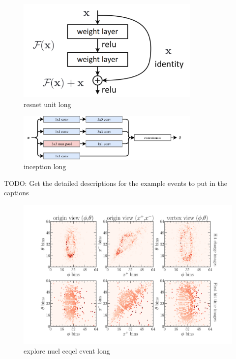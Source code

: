 \begin{figure}
    \includegraphics[width=0.8\textwidth]{diagrams/6-cvn/resnet_unit.png}
    \caption[resnet unit short]
    {resnet unit long}
    \label{fig:resnet_unit}
\end{figure}

\begin{figure}
    \includegraphics[width=0.8\textwidth]{diagrams/6-cvn/inception.pdf}
    \caption[inception short]
    {inception long}
    \label{fig:se}
\end{figure}

TODO: Get the detailed descriptions for the example events to put in the captions
\begin{figure}
    \includegraphics[width=\textwidth]{diagrams/6-cvn/chipsnet/explore_nuel_ccqel_event.pdf}
    \caption[explore nuel ccqel event short]
    {explore nuel ccqel event long}
    \label{fig:explore_nuel_ccqel_event}
\end{figure}

